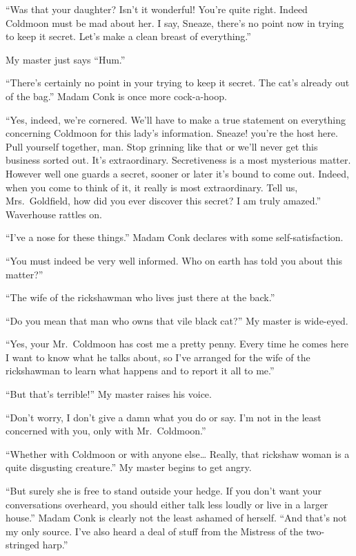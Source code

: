 \documentclass[12pt, openright]{book}
\begin{document}
``Was that your daughter? Isn't it wonderful! You're quite right. Indeed
Coldmoon must be mad about her. I say, Sneaze, there's no point now in
trying to keep it secret. Let's make a clean breast of everything.''

My master just says ``Hum.''

``There's certainly no point in your trying to keep it secret. The cat's
already out of the bag.'' Madam Conk is once more cock-a-hoop.

``Yes, indeed, we're cornered. We'll have to make a true statement on
everything concerning Coldmoon for this lady's information. Sneaze!
you're the host here. Pull yourself together, man. Stop grinning like
that or we'll never get this business sorted out. It's extraordinary.
Secretiveness is a most mysterious matter. However well one guards a
secret, sooner or later it's bound to come out. Indeed, when you come to
think of it, it really is most extraordinary. Tell us, Mrs.~Goldfield,
how did you ever discover this secret? I am truly amazed.'' Waverhouse
rattles on.

``I've a nose for these things.'' Madam Conk declares with some
self-satisfaction.

``You must indeed be very well informed. Who on earth has told you about
this matter?''

``The wife of the rickshawman who lives just there at the back.''

``Do you mean that man who owns that vile black cat?'' My master is
wide-eyed.

``Yes, your Mr.~Coldmoon has cost me a pretty penny. Every time he comes
here I want to know what he talks about, so I've arranged for the wife
of the rickshawman to learn what happens and to report it all to me.''

``But that's terrible!'' My master raises his voice.

``Don't worry, I don't give a damn what you do or say. I'm not in the
least concerned with you, only with Mr.~Coldmoon.''

``Whether with Coldmoon or with anyone else\ldots{} Really, that
rickshaw woman is a quite disgusting creature.'' My master begins to get
angry.

``But surely she is free to stand outside your hedge. If you don't want
your conversations overheard, you should either talk less loudly or live
in a larger house.'' Madam Conk is clearly not the least ashamed of
herself. ``And that's not my only source. I've also heard a deal of
stuff from the Mistress of the two-stringed harp.''
\end{document}
